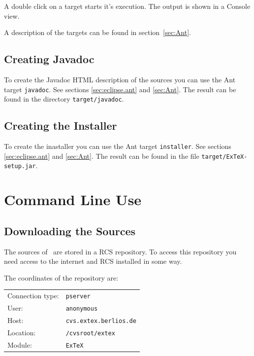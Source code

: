 \documentclass{extex-doc}
\newcommand\File[1]{\texttt{#1}}
\begin{document}
A double click on a target starts it's execution. The output is shown
in a Console view.

A description of the targets can be found in section~\ref{sec:Ant}.


\subsection{Creating Javadoc}

To create the Javadoc HTML description of the sources you can use the
Ant target \texttt{javadoc}. See sections \ref{sec:eclipse.ant} and
\ref{sec:Ant}. The result can be found in the directory
\File{target/javadoc}.


\subsection{Creating the Installer}

To create the inastaller you can use the Ant target
\texttt{installer}. See sections \ref{sec:eclipse.ant} and
\ref{sec:Ant}. The result can be found in the file
\File{target/ExTeX-setup.jar}.


\section{Command Line Use}




\subsection{Downloading the Sources}


The sources of \ExTeX\ are stored in a RCS repository. To access this
repository you need access to the internet and RCS installed in some
way.

The coordinates of the repository are:\medskip

\begin{tabular}{ll}\toprule
  Connection type: & \texttt{pserver}			\\
  User:		   & \texttt{anonymous}			\\
  Host:		   & \texttt{cvs.extex.berlios.de}	\\
  Location:	   & \texttt{/cvsroot/extex}		\\
  Module:	   & \texttt{ExTeX}			\\\bottomrule
\end{tabular}\medskip
\end{document}
